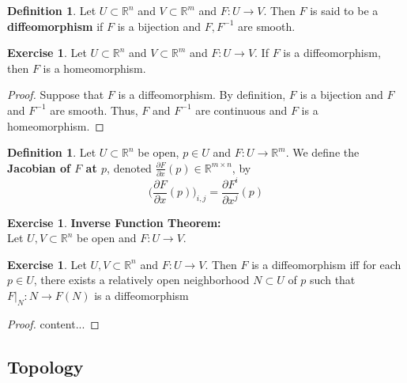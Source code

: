 \documentclass[12pt]{amsart}
\theoremstyle{definition}
\newtheorem{defn}[definition]{Definition}
\newtheorem{ex}[definition]{Exercise}
\newcommand{\R}{\mathbb{R}}
\newcommand{\p}{\partial}
\begin{document}
	\begin{defn}
		Let $U \subset \R^n$ and $V \subset \R^m$ and $F: U \rightarrow V$. Then $F$ is said to be a  \textbf{diffeomorphism} if $F$ is a bijection and $F, F^{-1}$ are smooth. 
	\end{defn}
	
	\begin{ex}
	Let $U \subset \R^n$ and $V \subset \R^m$ and $F: U \rightarrow V$. If $F$ is a diffeomorphism, then $F$ is a homeomorphism.
	\end{ex}
	
	\begin{proof}
	Suppose that $F$ is a diffeomorphism. By definition, $F$ is a bijection and $F$ and $F^{-1}$ are smooth. Thus, $F$ and $F^{-1}$ are continuous and $F$ is a homeomorphism.
	\end{proof}
	
	\begin{defn}
	Let $U \subset \R^n$ be open, $p \in U$ and $F: U \rightarrow \R^m$. We define the \textbf{Jacobian of $F$ at $p$}, denoted $\frac{\p F}{\p x}(p) \in \R^{m \times n}$, by $$\bigg (\frac{\p F}{\p x}(p) \bigg )_{i,j} = \frac{\p F^i}{\p x^j}(p)$$
	\end{defn}
	
	\begin{ex}\textbf{Inverse Function Theorem:}\\
	Let $U,V \subset \R^n$ be open and $F: U \rightarrow V$.
	\end{ex}
	
	\begin{ex}
		Let $U,V \subset \R^n$ and $F: U \rightarrow V$. Then $F$ is a diffeomorphism iff for each $p \in U$, there exists a relatively open neighborhood $N \subset U$ of $p$ such that $F|_N:N \rightarrow F(N)$ is a diffeomorphism
	\end{ex}
	
	\begin{proof}
		content...
	\end{proof}
















\newpage
\subsection{Topology}
\end{document}
